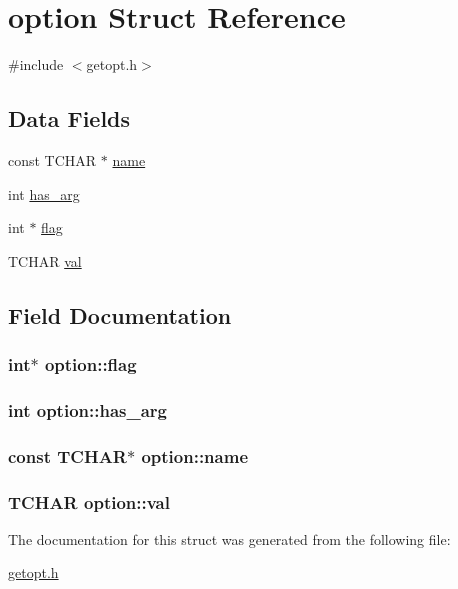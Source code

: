 \hypertarget{structoption}{\section{option Struct Reference}
\label{structoption}
}


{\ttfamily \#include $<$getopt.\-h$>$}

\subsection*{Data Fields}
\begin{DoxyCompactItemize}
\item 
const T\-C\-H\-A\-R $\ast$ \hyperlink{structoption_a1fdfcd410dfcb19d460d16223cfba45f}{name}
\item 
int \hyperlink{structoption_a90d7ee9a51eea5c002682dbd0af149e4}{has\-\_\-arg}
\item 
int $\ast$ \hyperlink{structoption_ab366eea5fe7be25c1928328ba715e353}{flag}
\item 
T\-C\-H\-A\-R \hyperlink{structoption_ae4804a970d4e654f66f48db2cfbf7750}{val}
\end{DoxyCompactItemize}


\subsection{Field Documentation}
\hypertarget{structoption_ab366eea5fe7be25c1928328ba715e353}{
\subsubsection[{flag}]{\setlength{\rightskip}{0pt plus 5cm}int$\ast$ {\bf option\-::flag}}}\label{structoption_ab366eea5fe7be25c1928328ba715e353}
\hypertarget{structoption_a90d7ee9a51eea5c002682dbd0af149e4}{
\subsubsection[{has\-\_\-arg}]{\setlength{\rightskip}{0pt plus 5cm}int {\bf option\-::has\-\_\-arg}}}\label{structoption_a90d7ee9a51eea5c002682dbd0af149e4}
\hypertarget{structoption_a1fdfcd410dfcb19d460d16223cfba45f}{
\subsubsection[{name}]{\setlength{\rightskip}{0pt plus 5cm}const T\-C\-H\-A\-R$\ast$ {\bf option\-::name}}}\label{structoption_a1fdfcd410dfcb19d460d16223cfba45f}
\hypertarget{structoption_ae4804a970d4e654f66f48db2cfbf7750}{
\subsubsection[{val}]{\setlength{\rightskip}{0pt plus 5cm}T\-C\-H\-A\-R {\bf option\-::val}}}\label{structoption_ae4804a970d4e654f66f48db2cfbf7750}


The documentation for this struct was generated from the following file\-:\begin{DoxyCompactItemize}
\item 
\hyperlink{getopt_8h}{getopt.\-h}\end{DoxyCompactItemize}

